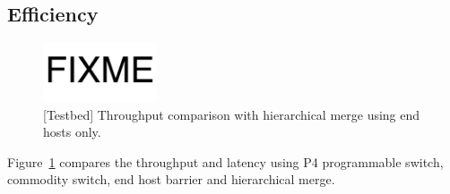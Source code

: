 \subsection{Efficiency}



\begin{figure}[t]
\centering
\includegraphics[width=0.3\textwidth]{images/fixme.pdf}
\caption{[Testbed] Throughput comparison with hierarchical merge using end hosts only.}
\label{fig:hierarchical-merge}
\end{figure}

Figure~\ref{fig:hierarchical-merge} compares the throughput and latency using P4 programmable switch, commodity switch, end host barrier and hierarchical merge.



